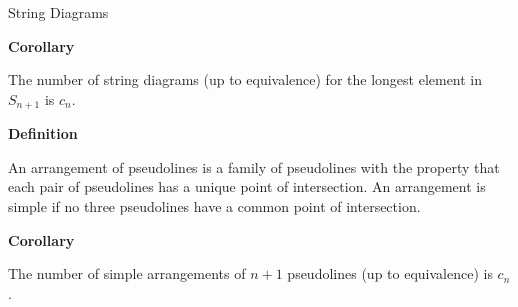 \documentclass[10pt, compress,aspectratio=169,handout]{beamer}
\begin{document}

\begin{frame}{String Diagrams}\pause

\vspace{1em}

\begin{block}{\textbf{Corollary}}

\vspace{-.5em}

The number of string diagrams (up to equivalence) for the longest element in $S_{n+1}$ is $c_n$.
\end{block}

\pause

\begin{block}{\textbf{Definition}}

\vspace{-.5em}

An \alert{arrangement of pseudolines} is a family of pseudolines with the property that each pair of pseudolines has a unique point of intersection. An arrangement is \alert{simple} if no three pseudolines have a common point of intersection.
\end{block}

\pause

\begin{block}{\textbf{Corollary}}

\vspace{-.5em}

The number of simple arrangements of $n+1$ pseudolines (up to equivalence) is $c_n$.
\end{block}

\end{frame}

\end{document}
